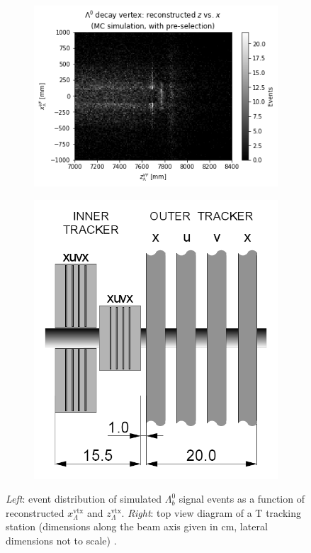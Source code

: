 \begin{figure}[t]
	\centering
	\begin{subfigure}{.45\textwidth}
		\includegraphics[width=\textwidth]{graphics/04-event_selection/Lambda_endvertex_z_vs_x.png}
		\caption{}
	\end{subfigure}
	\begin{subfigure}{.45\textwidth}
		\includegraphics[width=\textwidth]{graphics/04-event_selection/t_station_top_view.png}
		\caption{}
	\end{subfigure}
	\caption[A and b.]{\textit{Left}: event distribution of simulated $\Lambda_b^0$ signal events as a function of reconstructed $x_\Lambda^\text{vtx}$ and $z_\Lambda^\text{vtx}$. \textit{Right}: top view diagram of a T tracking station (dimensions along the beam axis given in \si{\centi\meter}, lateral dimensions not to scale) \cite{Barbosa-Marinho:582793}.}
\end{figure}

